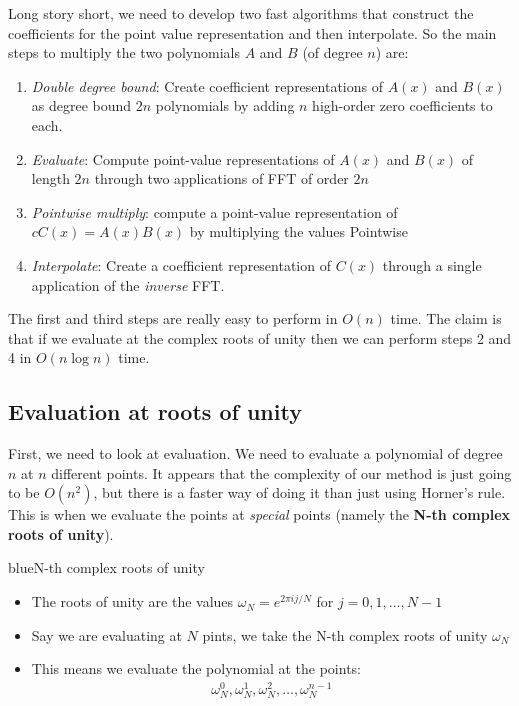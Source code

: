\documentclass[11pt,a4paper,titlepage,dvipsnames,cmyk]{scrartcl}
\begin{document}
Long story short, we need to develop two fast algorithms that construct
the coefficients for the point value representation and then
interpolate. So the main steps to multiply the two polynomials $A$ and $B$
(of degree $n$) are:

\begin{enumerate}
    \item \textit{Double degree bound}: Create coefficient representations
        of $A(x)$ and $B(x)$ as degree bound $2n$ polynomials by adding
        $n$ high-order zero coefficients to each.
    \item \textit{Evaluate}: Compute point-value representations of $A(x)$
        and $B(x)$ of length $2n$ through two applications of FFT of order
        $2n$
    \item \textit{Pointwise multiply}: compute a point-value
        representation of $cC(x) = A(x)B(x)$ by multiplying the values
        Pointwise
    \item \textit{Interpolate}: Create a coefficient representation of
        $C(x)$ through a single application of the \textit{inverse} FFT.
\end{enumerate}

The first and third steps are really easy to perform in $O(n)$ time. The
claim is that if we evaluate at the complex roots of unity then we can
perform steps 2 and 4 in $O(n \log n)$ time.

\subsection{Evaluation at roots of unity}%
\label{sub:roots-unity}
First, we need to look at evaluation. We need to evaluate a polynomial of
degree $n$ at $n$ different points. It appears that the complexity of our
method is just going to be $O(n^2)$, but there is a faster way of doing it
than just using Horner's rule. This is when we evaluate the points at
\textit{special} points (namely the \textbf{N-th complex roots of unity}).

\begin{titlebox}{blue}{N-th complex roots of unity}
    \begin{itemize}
        \item The roots of unity are the values $\omega_N = e^{2\pi i j /
            N}$ for $j = 0,1,\dots,N-1$
        \item Say we are evaluating at $N$ pints, we take the N-th complex
            roots of unity $\omega_N$
        \item This means we evaluate the polynomial at the points:
            \begin{align*}
                \omega_N^0,\omega_N^1,\omega_N^2,\dots,\omega_N^{n-1}
            \end{align*}
    \end{itemize}
\end{titlebox}
\end{document}
